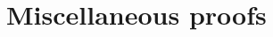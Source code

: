 \documentclass[a4paper, 12pt, openany]{book} %
\begin{document}
\chapter{Miscellaneous proofs}
\label{ap:proofs}



% 
\end{document}
